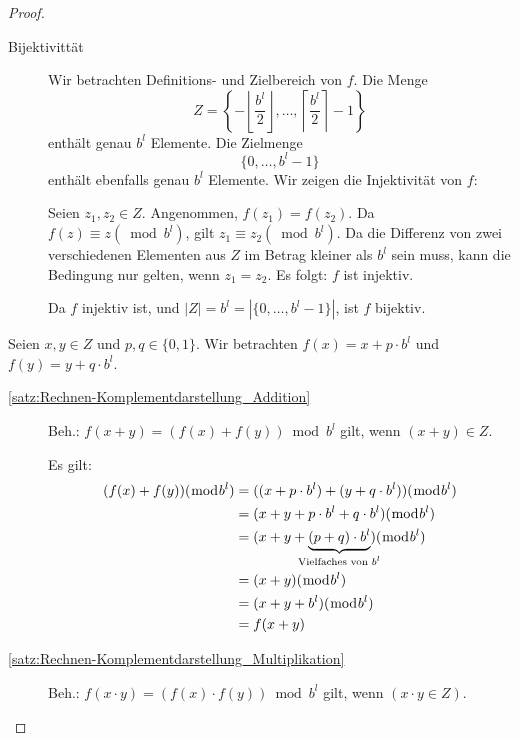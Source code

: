 \documentclass{article}
\begin{document}
    \begin{proof}
      \begin{description}
        \item[Bijektivittät] Wir betrachten Definitions- und Zielbereich von $f$.
          Die Menge \[Z = \left\{ - \left\lfloor \displaystyle\frac{b^l}{2} \right\rfloor , \dots, \left\lceil \displaystyle\frac{b^l}{2} \right\rceil -1 \right\}\] enthält genau $b^l$ Elemente.
          Die Zielmenge \[\{0,\dots,b^l-1\}\] enthält ebenfalls genau $b^l$ Elemente.
          Wir zeigen die Injektivität von $f$: 

          Seien $z_1, z_2 \in Z$. Angenommen, $f(z_1) = f(z_2)$.
          Da $f(z) \equiv z (\bmod b^l)$, gilt $z_1 \equiv z_2 (\bmod b^l)$.
          Da die Differenz von zwei verschiedenen Elementen aus $Z$ im Betrag kleiner als $b^l$ sein muss, kann die Bedingung nur gelten, wenn $z_1 = z_2$.
          Es folgt: $f$ ist injektiv.

          Da $f$ injektiv ist, und $|Z| = b^l = |\{0,\dots,b^l-1\}|$, ist $f$ bijektiv.
      \end{description}

      Seien $x,y \in Z$ und $p,q \in \{0,1\}$. 
      Wir betrachten $f(x)=x + p\cdot b^l$ und $f(y)=y + q \cdot b^l$.
      
      \begin{description}
        \item[\ref{satz:Rechnen-Komplementdarstellung_Addition}] Beh.: $f(x+y) = (f(x)+f(y)) \bmod b^l$ gilt, wenn $(x+y) \in Z$. 
          
          Es gilt:
          \begin{align*}
            (f(x)+f(y)) (\bmod b^l) &= ((x+p\cdot b^l) + (y+q\cdot b^l)) (\bmod b^l) \\
            &= (x+y+p \cdot b^l + q \cdot b^l) (\bmod b^l) \\
            &= (x+y+ \underbrace{(p+q)\cdot b^l}_{\mathclap{\text{Vielfaches von }b^l}}) (\bmod b^l) \\
            &= (x+y) (\bmod b^l) \\
            &= (x+y+b^l) (\bmod b^l) \\
            &= f(x+y)
          \end{align*}

        \item[\ref{satz:Rechnen-Komplementdarstellung_Multiplikation}] Beh.: $f(x \cdot y) = (f(x) \cdot f(y)) \bmod b^l$ gilt, wenn $(x\cdot y \in Z)$.
          

\end{description}
\end{proof}
\end{document}
